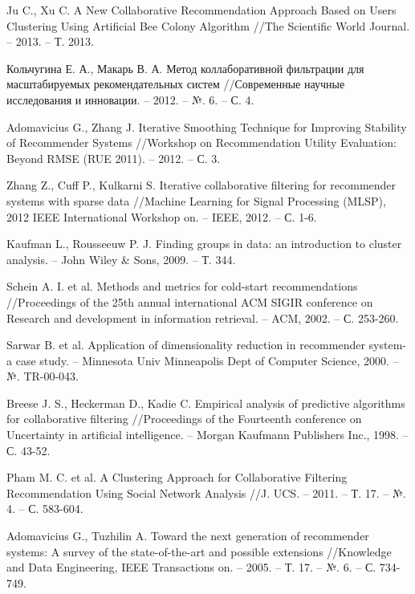 \documentclass[a4paper, 12pt]{article} %
\begin{document}
\newpage
\cleardoublepage

\begin{thebibliography}{99}
 Ju C., Xu C. A New Collaborative Recommendation Approach Based on Users Clustering Using Artificial Bee Colony Algorithm //The Scientific World Journal. – 2013. – Т. 2013.

 Кольчугина Е. А., Макарь В. А. Метод коллаборативной фильтрации для масштабируемых рекомендательных систем //Современные научные исследования и инновации. – 2012. – №. 6. – С. 4.

 Adomavicius G., Zhang J. Iterative Smoothing Technique for Improving Stability of Recommender Systems //Workshop on Recommendation Utility Evaluation: Beyond RMSE (RUE 2011). – 2012. – С. 3.

 Zhang Z., Cuff P., Kulkarni S. Iterative collaborative filtering for recommender systems with sparse data //Machine Learning for Signal Processing (MLSP), 2012 IEEE International Workshop on. – IEEE, 2012. – С. 1-6.

 Kaufman L., Rousseeuw P. J. Finding groups in data: an introduction to cluster analysis. – John Wiley \& Sons, 2009. – Т. 344.

 Schein A. I. et al. Methods and metrics for cold-start recommendations //Proceedings of the 25th annual international ACM SIGIR conference on Research and development in information retrieval. – ACM, 2002. – С. 253-260.

 Sarwar B. et al. Application of dimensionality reduction in recommender system-a case study. – Minnesota Univ Minneapolis Dept of Computer Science, 2000. – №. TR-00-043.

 Breese J. S., Heckerman D., Kadie C. Empirical analysis of predictive algorithms for collaborative filtering //Proceedings of the Fourteenth conference on Uncertainty in artificial intelligence. – Morgan Kaufmann Publishers Inc., 1998. – С. 43-52.

 Pham M. C. et al. A Clustering Approach for Collaborative Filtering Recommendation Using Social Network Analysis //J. UCS. – 2011. – Т. 17. – №. 4. – С. 583-604.

 Adomavicius G., Tuzhilin A. Toward the next generation of recommender systems: A survey of the state-of-the-art and possible extensions //Knowledge and Data Engineering, IEEE Transactions on. – 2005. – Т. 17. – №. 6. – С. 734-749.


\end{thebibliography}
\end{document}

